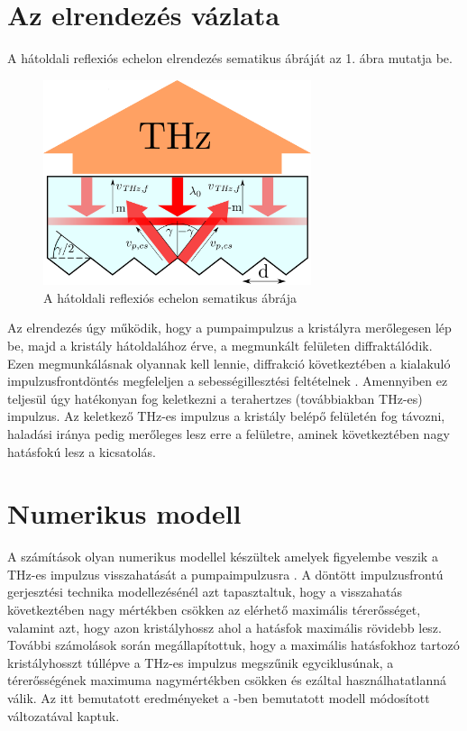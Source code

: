 \documentclass[12pt, a4paper]{article}
\begin{document}
\section{Az elrendezés vázlata}
A hátoldali reflexiós echelon elrendezés sematikus ábráját az 1. ábra mutatja be.
\begin{figure}[H]
\centering
\includegraphics[width=0.7\textwidth]{rajz-1.pdf}
\caption{A hátoldali reflexiós echelon sematikus ábrája \cite{toth2019single}}
\end{figure}
Az elrendezés úgy működik, hogy a pumpaimpulzus a kristályra merőlegesen lép be, majd a kristály hátoldalához érve, a megmunkált felületen diffraktálódik. Ezen megmunkálásnak olyannak kell lennie, diffrakció következtében a kialakuló impulzusfrontdöntés megfeleljen a sebességillesztési feltételnek \cite{hebling2002velocity}. Amennyiben ez teljesül úgy hatékonyan fog keletkezni a terahertzes (továbbiakban THz-es) impulzus. Az keletkező THz-es impulzus a kristály belépő felületén fog távozni, haladási iránya pedig merőleges lesz erre a felületre, aminek következtében nagy hatásfokú lesz a kicsatolás. 
\section{Numerikus modell}
A számítások olyan numerikus modellel készültek amelyek figyelembe veszik a THz-es impulzus visszahatását a pumpaimpulzusra \cite{ravi2014limitations}. A döntött impulzusfrontú gerjesztési technika modellezésénél azt tapasztaltuk, hogy a visszahatás következtében nagy mértékben csökken az elérhető maximális térerősséget, valamint azt, hogy azon kristályhossz ahol a hatásfok maximális rövidebb lesz. További számolások során megállapítottuk, hogy a maximális hatásfokhoz tartozó kristályhosszt túllépve a THz-es impulzus megszűnik egyciklusúnak, a térerősségének maximuma nagymértékben csökken és ezáltal használhatatlanná válik. Az itt bemutatott eredményeket a \cite{ravi2014limitations}-ben bemutatott modell módosított változatával kaptuk.
\end{document}
